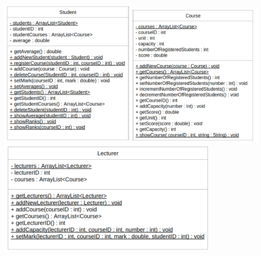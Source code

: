 \documentclass[]{article}
\begin{document}
\begin{center}
\includegraphics[width=0.49\textwidth ]{uml1.png}	
\includegraphics[width=0.49\textwidth ]{uml2.png}
\includegraphics[width=0.8\textwidth ]{uml3.png}
\end{center}
\newpage
\end{document}
